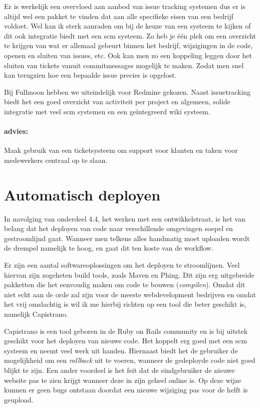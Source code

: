 Er is werkelijk een overvloed aan aanbod van issue tracking systemen\cite{issuetracking} dus er is altijd wel een pakket te vinden dat aan alle specifieke eisen van een bedrijf voldoet. Wel kan ik sterk aanraden om bij de keuze van een systeem te kijken of dit ook integratie biedt met een {\sc scm} systeem. Zo heb je één plek om een overzicht te krijgen van wat er allemaal gebeurt binnen het bedrijf, wijzigingen in de code, openen en sluiten van issues, etc. Ook kan men zo een koppeling leggen door het sluiten van tickets vanuit commitmessages mogelijk te maken. Zodat men snel kan terugzien hoe een bepaalde issue precies is opgelost.

Bij Fullmoon hebben we uiteindelijk voor Redmine\cite{redmine} gekozen. Naast issuetracking biedt het een goed overzicht van activiteit per project en algemeen, solide integratie met veel {\sc scm} systemen en een geïntegreerd wiki systeem.

\paragraph{advies:} Maak gebruik van een ticketsysteem om support voor klanten en taken voor medewerkers centraal op te slaan. 

\section{Automatisch deployen}

In navolging van onderdeel 4.4, het werken met een ontwikkelstraat, is het van belang dat het deployen van code naar verschillende omgevingen soepel en gestroomlijnd gaat. Wanneer men telkens alles handmatig moet uploaden wordt de drempel namelijk te hoog, en gaat dit ten koste van de workflow.

Er zijn een aantal softwareoplossingen om het deployen te stroomlijnen. Veel hiervan zijn zogeheten build tools, zoals Maven\cite{maven} en Phing\cite{phing}. Dit zijn erg uitgebreide pakketten die het eenvoudig maken om code te bouwen (\emph{compilen}). Omdat dit niet echt aan de orde zal zijn voor de meeste webdevelopment bedrijven en omdat het vrij omslachtig is wil ik me hierbij richten op een tool die beter geschikt is, namelijk Capistrano\cite{capistrano}.

Capistrano is een tool geboren in de Ruby on Rails community en is bij uitstek geschikt voor het deployen van nieuwe code. Het koppelt erg goed met een {\sc scm} systeem en neemt veel werk uit handen. Hiernaast biedt het de gebruiker de mogelijkheid om een \emph{rollback} uit te voeren, wanneer de gedeployde code niet goed blijkt te zijn. Een ander voordeel is het feit dat de eindgebruiker de nieuwe website pas te zien krijgt wanneer deze in zijn geheel online is. Op deze wijze kunnen er geen bugs ontstaan doordat een nieuwe wijziging pas voor de helft is geupload.

